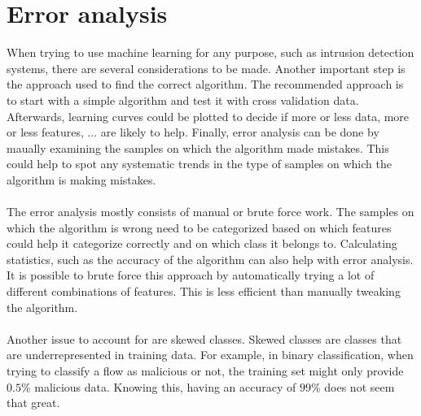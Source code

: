 \section{Error analysis}
When trying to use machine learning for any purpose, such as intrusion detection systems, there are several considerations to be made. Another important step is the approach used to find the correct algorithm. 
The recommended approach is to start with a simple algorithm and test it with cross validation data. Afterwards, learning curves could be plotted to decide if more or less data, more or less features, ... are likely to help. Finally, error analysis can be done by maually examining the samples on which the algorithm made mistakes. This could help to spot any systematic trends in the type of samples on which the algorithm is making mistakes.\\\\
The error analysis mostly consists of manual or brute force work. The samples on which the algorithm is wrong need to be categorized based on which features could help it categorize correctly and on which class it belongs to. Calculating statistics, such as the accuracy of the algorithm can also help with error analysis. It is possible to brute force this approach by automatically trying a lot of different combinations of features. This is less efficient than manually tweaking the algorithm.\\\\
Another issue to account for are skewed classes. Skewed classes are classes that are underrepresented in training data. For example, in binary classification, when trying to classify a flow as malicious or not, the training set might only provide $0.5$\% malicious data. Knowing this, having an accuracy of $99$\% does not seem that great.

